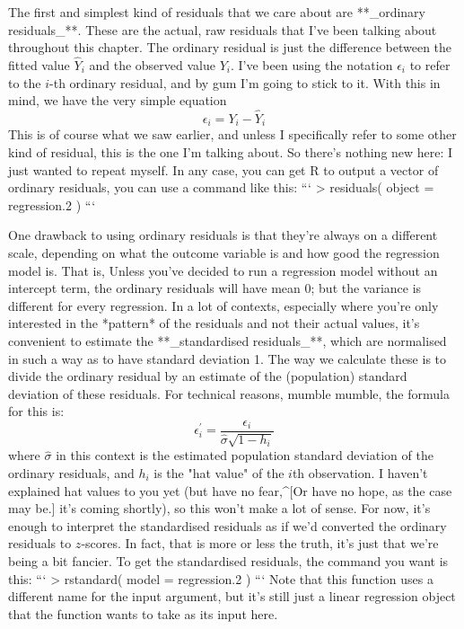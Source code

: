 The first and simplest kind of residuals that we care about are **_ordinary residuals_**. These are the actual, raw residuals that I've been talking about throughout this chapter. The ordinary residual is just the difference between the fitted value $\hat{Y}_i$ and the observed value $Y_i$. I've been using the notation $\epsilon_i$ to refer to the $i$-th ordinary residual, and by gum I'm going to stick to it. With this in mind, we have the very simple equation
$$
\epsilon_i = Y_i - \hat{Y}_i
$$
This is of course what we saw earlier, and unless I specifically refer to some other kind of residual, this is the one I'm talking about. So there's nothing new here: I just wanted to repeat myself. In any case, you can get R to output a vector of ordinary residuals, you can use a command like this:
```
> residuals( object = regression.2 )
```

One drawback to using ordinary residuals is that they're always on a different scale, depending on what the outcome variable is and how good the regression model is. That is, Unless you've decided to run a regression model without an intercept term, the ordinary residuals will have mean 0; but the variance is different for every regression. In a lot of contexts, especially where you're only interested in the *pattern* of the residuals and not their actual values, it's convenient to estimate the **_standardised residuals_**, which are normalised in such a way as to have standard deviation 1. The way we calculate these is to divide the ordinary residual by an estimate of the (population) standard deviation of these residuals. For technical reasons, mumble mumble, the formula for this is:
$$
\epsilon_{i}^\prime = \frac{\epsilon_i}{\hat{\sigma} \sqrt{1-h_i}}
$$
where $\hat\sigma$ in this context is the estimated population standard deviation of the ordinary residuals, and $h_i$ is the "hat value" of the $i$th observation. I haven't explained hat values to you yet (but have no fear,^[Or have no hope, as the case may be.] it's coming shortly), so this won't make a lot of sense. For now, it's enough to interpret the standardised residuals as if we'd converted the ordinary residuals to $z$-scores. In fact, that is more or less the truth, it's just that we're being a bit fancier. To get the standardised residuals, the command you want is this:
```
> rstandard( model = regression.2 )
```
Note that this function uses a different name for the input argument, but it's still just a linear regression object that the function wants to take as its input here.

